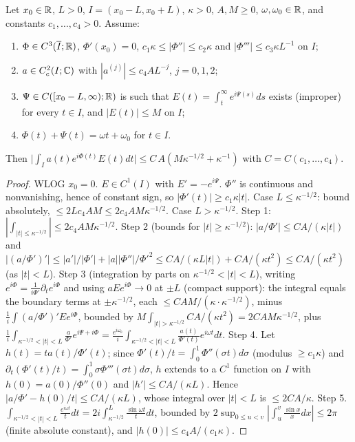 \begin{lemma}
  \label{lem:appendix_triangle}
  Let $x_0\in\mathbb{R}$, $L>0$, $I=(x_0-L,x_0+L)$, $\kappa>0$, $A,M\ge0$, $\omega,\omega_0\in\mathbb{R}$, and constants $c_1,\dots,c_4>0$. Assume:
  \begin{enumerate}
    \item $\Phi\in C^3(\overline{I};\mathbb{R})$, $\Phi'(x_0)=0$, $c_1\kappa\le|\Phi''|\le c_2\kappa$ and $|\Phi'''|\le c_3\kappa L^{-1}$ on $I$;
    \item $a\in C^2_c(I;\mathbb{C})$ with $|a^{(j)}|\le c_4AL^{-j}$, $j=0,1,2$;
    \item $\Psi\in C([x_0-L,\infty);\mathbb{R})$ is such that $E(t)=\int_t^\infty e^{i\Psi(s)}ds$ exists (improper) for every $t\in I$, and $|E(t)|\le M$ on $I$;
    \item $\Phi(t)+\Psi(t)=\omega t+\omega_0$ for $t\in I$.
  \end{enumerate}
  Then $\bigl|\int_Ia(t)e^{i\Phi(t)}E(t)dt\bigr|\le C\,A(M\kappa^{-1/2}+\kappa^{-1})$ with $C=C(c_1,\dots,c_4)$.
\end{lemma}
\begin{proof}
  WLOG $x_0=0$. $E\in C^1(I)$ with $E'=-e^{i\Psi}$. $\Phi''$ is continuous and nonvanishing, hence of constant sign, so $|\Phi'(t)|\ge c_1\kappa|t|$.
  Case $L\le\kappa^{-1/2}$: bound absolutely, $\le2Lc_4AM\le2c_4AM\kappa^{-1/2}$.
  Case $L>\kappa^{-1/2}$. Step 1: $|\int_{|t|\le\kappa^{-1/2}}|\le2c_4AM\kappa^{-1/2}$.
  Step 2 (bounds for $|t|\ge\kappa^{-1/2}$): $|a/\Phi'|\le CA/(\kappa|t|)$ and $|(a/\Phi')'|\le|a'|/|\Phi'|+|a||\Phi''|/\Phi'^2\le CA/(\kappa L|t|)+CA/(\kappa t^2)\le CA/(\kappa t^2)$ (as $|t|<L$).
  Step 3 (integration by parts on $\kappa^{-1/2}<|t|<L$), writing $e^{i\Phi}=\frac1{i\Phi'}\partial_te^{i\Phi}$ and using $aEe^{i\Phi}\to0$ at $\pm L$ (compact support):
  the integral equals the boundary terms at $\pm\kappa^{-1/2}$, each $\le CAM/(\kappa\cdot\kappa^{-1/2})$, minus $\frac1i\int(a/\Phi')'Ee^{i\Phi}$, bounded by $M\int_{|t|>\kappa^{-1/2}}CA/(\kappa t^2)=2CAM\kappa^{-1/2}$, plus
  $\frac1i\int_{\kappa^{-1/2}<|t|<L}\frac{a}{\Phi'}e^{i\Psi+i\Phi}=\frac{e^{i\omega_0}}i\int_{\kappa^{-1/2}<|t|<L}\frac{a(t)}{\Phi'(t)}e^{i\omega t}dt$.
  Step 4. Let $h(t)=ta(t)/\Phi'(t)$; since $\Phi'(t)/t=\int_0^1\Phi''(\sigma t)d\sigma$ (modulus $\ge c_1\kappa$) and $\partial_t(\Phi'(t)/t)=\int_0^1\sigma\Phi'''(\sigma t)d\sigma$, $h$ extends to a $C^1$ function on $I$ with $h(0)=a(0)/\Phi''(0)$ and $|h'|\le CA/(\kappa L)$. Hence $|a/\Phi'-h(0)/t|\le CA/(\kappa L)$, whose integral over $|t|<L$ is $\le2CA/\kappa$.
  Step 5. $\int_{\kappa^{-1/2}<|t|<L}\frac{e^{i\omega t}}tdt=2i\int_{\kappa^{-1/2}}^L\frac{\sin\omega t}tdt$, bounded by $2\sup_{0\le u<v}|\int_u^v\frac{\sin x}xdx|\le 2\pi$ (finite absolute constant), and $|h(0)|\le c_4A/(c_1\kappa)$.
\end{proof}


